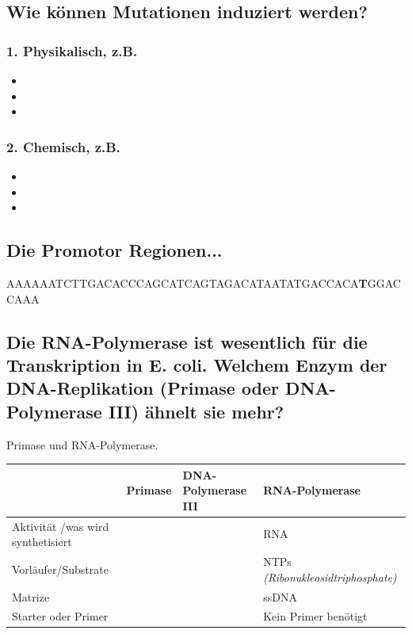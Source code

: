 \documentclass{article}
\begin{document}
\subsection*{Wie können Mutationen induziert werden?}
\subsubsection*{1. Physikalisch, z.B.} 
    
    \begin{itemize}
    \item 
    \item 
    \item
\end{itemize}
\subsubsection*{2. Chemisch, z.B.} 
\begin{itemize}
    \item 
    \item 
    \item 
\end{itemize}


\subsection*{Die Promotor Regionen...}
\centerline{AAAAAATCTTGACACCCAGCATCAGTAGACATAATATGACCACA\textbf{T}GGACCAAA} 

\subsection*{Die RNA-Polymerase ist wesentlich für die Transkription in E. coli. Welchem Enzym der DNA-Replikation (Primase oder DNA-Polymerase III) ähnelt sie mehr?}
Primase und RNA-Polymerase. 
\begin{table}[h] 
    \centering
    \begin{tabular}{|p{3cm}||p{4cm}|p{4cm}|p{4cm}|}\hline
         & Primase &  DNA-Polymerase III & RNA-Polymerase\\ \hline \hline
         Aktivität /was wird synthetisiert & & &  RNA \\\hline
         Vorläufer/Substrate &  & & NTPs \textit{(Ribonukleosidtriphosphate)} \\\hline
         Matrize & & &  ssDNA \\\hline
         Starter oder Primer & & &  Kein Primer benötigt \\\hline
    \end{tabular}
    \label{tab:my_label}
\end{table}
\end{document}
